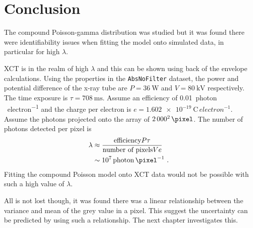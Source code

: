 \section{Conclusion}
The compound Poisson-gamma distribution was studied but it was found there were identifiability issues when fitting the model onto simulated data, in particular for high $\lambda$.

XCT is in the realm of high $\lambda$ and this can be shown using back of the envelope calculations. Using the properties in the \texttt{AbsNoFilter} dataset, the power and potential difference of the x-ray tube are $P=\SI{36}{\watt}$ and $V=\SI{80}{\kilo\volt}$ respectively. The time exposure is $\tau=\SI{708}{\milli\second}$. Assume an efficiency of \SI{0.01}{{photon}\,{electron}^{-1}} and the charge per electron is $e=\SI{1.602e-19}{\coulomb\,{electron}^{-1}}$. Assume the photons projected onto the array of $2\,000^2\,\si{\pixel}$. The number of photons detected per pixel is
\begin{align*}
\lambda &\approx \dfrac{\text{efficiency} P \tau}{\text{number of pixels} V e}
\\
&\sim 10^7\,\si{{photon}\,\pixel^{-1}}
\ .
\end{align*}
Fitting the compound Poisson model onto XCT data would not be possible with such a high value of $\lambda$.

All is not lost though, it was found there was a linear relationship between the variance and mean of the grey value in a pixel. This suggest the uncertainty can be predicted by using such a relationship. The next chapter investigates this.
